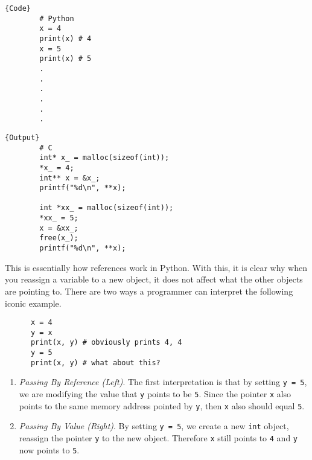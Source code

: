 \documentclass{article}
\begin{document}
    \noindent\begin{minipage}{.5\textwidth}
      \begin{lstlisting}[]{Code}
        # Python 
        x = 4 
        print(x) # 4
        x = 5
        print(x) # 5
        .
        .
        .
        .
        .
        .
      \end{lstlisting}
      \end{minipage}
      \hfill
      \begin{minipage}{.49\textwidth}
      \begin{lstlisting}[]{Output}
        # C
        int* x_ = malloc(sizeof(int)); 
        *x_ = 4; 
        int** x = &x_; 
        printf("%d\n", **x); 

        int *xx_ = malloc(sizeof(int)); 
        *xx_ = 5; 
        x = &xx_; 
        free(x_); 
        printf("%d\n", **x); 
      \end{lstlisting}
    \end{minipage}

    This is essentially how references work in Python. With this, it is clear why when you reassign a variable to a new object, it does not affect what the other objects are pointing to. There are two ways a programmer can interpret the following iconic example. 

    \begin{lstlisting}
      x = 4 
      y = x 
      print(x, y) # obviously prints 4, 4
      y = 5
      print(x, y) # what about this? 
    \end{lstlisting}
    \begin{enumerate}
      \item \textit{Passing By Reference (Left)}. The first interpretation is that by setting \texttt{y = 5}, we are modifying the value that \texttt{y} points to be \texttt{5}. Since the pointer \texttt{x} also points to the same memory address pointed by \texttt{y}, then \texttt{x} also should equal \texttt{5}. 
      \item \textit{Passing By Value (Right)}. By setting \texttt{y = 5}, we create a new \texttt{int} object, reassign the pointer \texttt{y} to the new object. Therefore \texttt{x} still points to \texttt{4} and \texttt{y} now points to \texttt{5}. 
    \end{enumerate}
    
\end{document}
